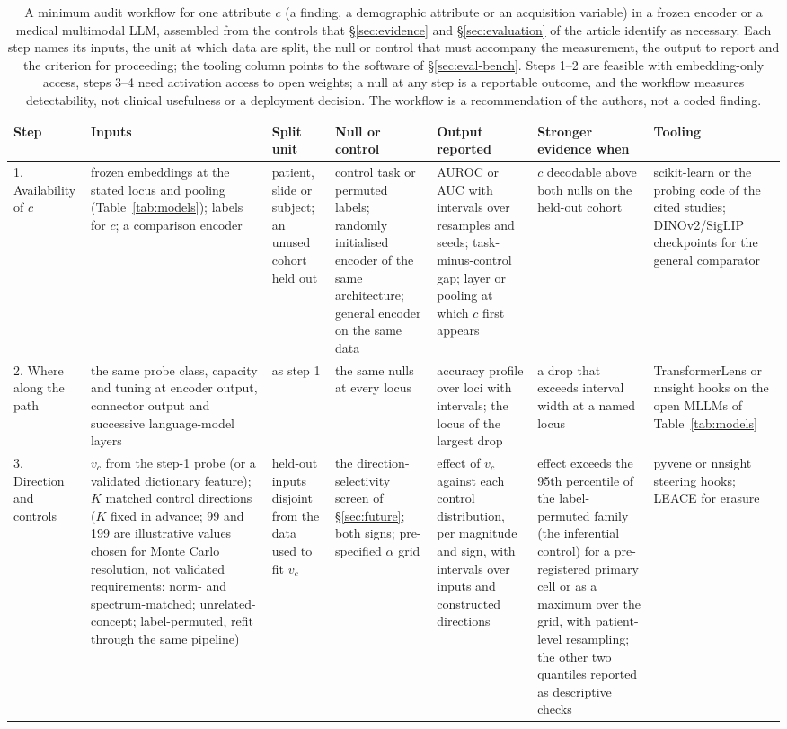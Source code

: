 \begin{table}[!tbp]
\centering\scriptsize\setlength\tabcolsep{3pt}\renewcommand{\arraystretch}{1.0}
\caption{A minimum audit workflow for one attribute $c$ (a finding, a demographic attribute or an acquisition variable) in a frozen encoder or a medical multimodal LLM, assembled from the controls that \S\ref{sec:evidence} and \S\ref{sec:evaluation} of the article identify as necessary. Each step names its inputs, the unit at which data are split, the null or control that must accompany the measurement, the output to report and the criterion for proceeding; the tooling column points to the software of \S\ref{sec:eval-bench}. Steps 1--2 are feasible with embedding-only access, steps 3--4 need activation access to open weights; a null at any step is a reportable outcome, and the workflow measures detectability, not clinical usefulness or a deployment decision. The workflow is a recommendation of the authors, not a coded finding.}
\label{tab:workflow}
\begin{tabular}{@{}L{1.6cm}L{2.6cm}L{1.45cm}L{2.95cm}L{2.6cm}L{1.95cm}L{1.8cm}@{}}
\toprule
Step & Inputs & Split unit & Null or control & Output reported & Stronger evidence when & Tooling \\
. Availability of $c$ & frozen embeddings at the stated locus and pooling (Table~\ref{tab:models}); labels for $c$; a comparison encoder & patient, slide or subject; an unused cohort held out & control task or permuted labels; randomly initialised encoder of the same architecture; general encoder on the same data & AUROC or AUC with intervals over resamples and seeds; task-minus-control gap; layer or pooling at which $c$ first appears & $c$ decodable above both nulls on the held-out cohort & scikit-learn or the probing code of the cited studies; DINOv2/SigLIP checkpoints for the general comparator \\
2. Where along the path & the same probe class, capacity and tuning at encoder output, connector output and successive language-model layers & as step 1 & the same nulls at every locus & accuracy profile over loci with intervals; the locus of the largest drop & a drop that exceeds interval width at a named locus & TransformerLens or nnsight hooks on the open MLLMs of Table~\ref{tab:models} \\
3. Direction and controls & $v_c$ from the step-1 probe (or a validated dictionary feature); $K$ matched control directions ($K$ fixed in advance; 99 and 199 are illustrative values chosen for Monte Carlo resolution, not validated requirements: norm- and spectrum-matched; unrelated-concept; label-permuted, refit through the same pipeline) & held-out inputs disjoint from the data used to fit $v_c$ & the direction-selectivity screen of \S\ref{sec:future}; both signs; pre-specified $\alpha$ grid & effect of $v_c$ against each control distribution, per magnitude and sign, with intervals over inputs and constructed directions & effect exceeds the 95th percentile of the label-permuted family (the inferential control) for a pre-registered primary cell or as a maximum over the grid, with patient-level resampling; the other two quantiles reported as descriptive checks & pyvene or nnsight steering hooks; LEACE for erasure \\

\end{tabular}
\end{table}
